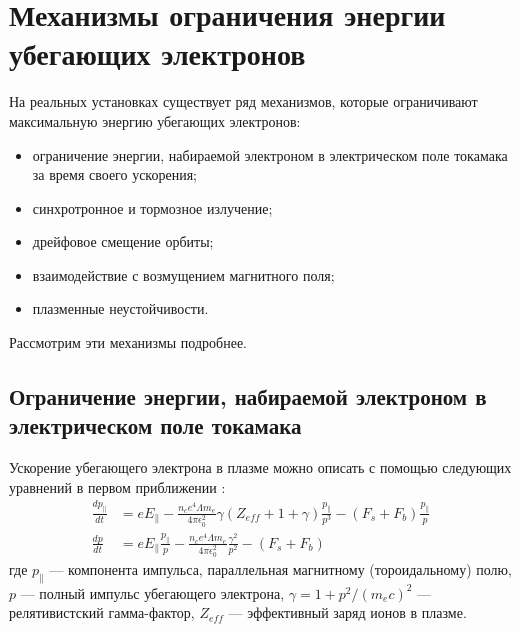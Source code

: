 
\section{Механизмы ограничения энергии убегающих электронов}

На реальных установках существует ряд механизмов, которые ограничивают максимальную энергию убегающих электронов: 

\begin{itemize}
  \item ограничение энергии, набираемой электроном в электрическом поле токамака за время своего ускорения;
  \item синхротронное и тормозное излучение;
  \item дрейфовое смещение орбиты;
  \item взаимодействие с возмущением магнитного поля;
  \item плазменные неустойчивости.
\end{itemize}

Рассмотрим эти механизмы подробнее.


\subsection{Ограничение энергии, набираемой электроном в электрическом поле токамака}

Ускорение убегающего электрона в плазме можно описать с помощью следующих уравнений в первом приближении \cite{MartinSolis1998,Bakhtiari2005}:
\begin{equation}
  \label{eq:AccelerationRunaways}
  \begin{alignedat}{1}
    \frac{ d p_{\parallel} }{ d t } & = e E_{\parallel} - \frac{ n_c e^4 \Lambda m_e }{ 4 \pi \epsilon_0^2 } \gamma ( Z_{eff} + 1 + \gamma ) \frac{ p_{\parallel} }{ p^3 } - ( F_s + F_b ) \frac{ p_{\parallel} }{ p }   \\
    \frac{ d p }{ d t } & = e E_{\parallel} \frac{ p_{\parallel} }{ p } - \frac{ n_c e^4 \Lambda m_e }{ 4 \pi \epsilon_0^2 } \frac{ \gamma^2 }{ p^2 } - ( F_s + F_b )
  \end{alignedat}  
\end{equation}
где $ p_{\parallel} $ --- компонента импульса, параллельная магнитному (тороидальному) полю, $p$ --- полный импульс убегающего электрона, $\gamma = 1 + p^2 / ( m_e c )^2$ --- релятивистский гамма-фактор, $Z_{eff}$ --- эффективный заряд ионов в плазме. 

